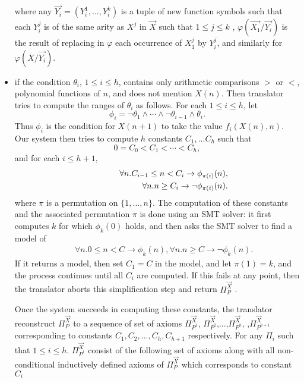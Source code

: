\begin{itemize}
	where any $\vec{Y_i} = (Y^1_{i}, ..., Y^k_{i})$ is a tuple of new function symbols such that each $Y^j_{i}$ is of the same arity as $X^j$
in $\vec{X}$ such that $1\leq j \leq k$ , $\varphi(\vec{X_1}/\vec{Y_i} )$ is the result of replacing in $\varphi$
each occurrence of $X^j_1$ by $Y^j_{i}$, and similarly for $\varphi(X/\vec{Y_i})$.

 \item if the condition $\theta_i$, $1\leq i\leq h$, contains only
 arithmetic comparisons $>$ or $<$, polynomial functions of $n$, and does
 not mention $X(n)$. Then translator tries to compute the ranges
 of $\theta_i$ as follows. For each $1\leq i\leq h$, let
 \[
 \phi_i = \neg \theta_1\land\cdots\land\neg \theta_{i-1}\land \theta_i.
 \]
 Thus $\phi_i$ is the condition
 for $X(n+1)$ to take the value $f_i(X(n),n)$. Our system then tries
 to compute $h$ constants $C_1,...C_h$ such that
 \[
 0=C_0<C_1<\cdots<C_h,
 \]
 and for each $i\leq h+1$,
 \vspace{-0.2cm}
 \begin{eqnarray*}
 	&&
 	\forall n. C_{i-1}\leq n< C_i\rightarrow \phi_{\pi(i)}(n) , \\
 	&&\hspace{20mm}\forall n. n\geq C_i\rightarrow \neg \phi_{\pi(i)}(n).
 \end{eqnarray*}
 where $\pi$ is a permutation on $\{1,...,n\}$. The computation of
 these constants and the associated permutation $\pi$ is done using
 an SMT solver: it first computes $k$ for which $\phi_k(0)$ holds, and then
 asks the SMT solver to find a model of
 \begin{eqnarray*}
 	&&
 	\forall n. 0\leq n< C\rightarrow \phi_k(n), \forall n. n\geq C\rightarrow \neg \phi_k(n).
 \end{eqnarray*}
 If it returns a model, then set $C_1=C$ in the model, and let $\pi(1)=k$,
 and the process continues until all $C_i$ are computed. If this fails
 at any point, then the translator aborts this simplification step and return $\Pi_P^{\vec{X}}$ .

Once the system succeeds in computing these constants, the translator reconstruct $\Pi_P^{\vec{X}}$ to a sequence of set of axioms $\Pi_{P^{1}}^{\vec{X}}$, $\Pi_{P^{2}}^{\vec{X}}$,...,$\Pi_{P^{h}}^{\vec{X}}$, ,$\Pi_{P^{h+1}}^{\vec{X}}$ corresponding to constants $C_1, C_2,...,C_h, C_{h+1}$ respectively.
For any $\Pi_i$ such that $1\leq i\leq h$. $\Pi_{P^{1}}^{\vec{X}}$ consist of the following set of axioms along with all non-conditional inductively defined axioms of $\Pi_P^{\vec{X}}$  which corresponds to constant $C_i$


\end{itemize}

